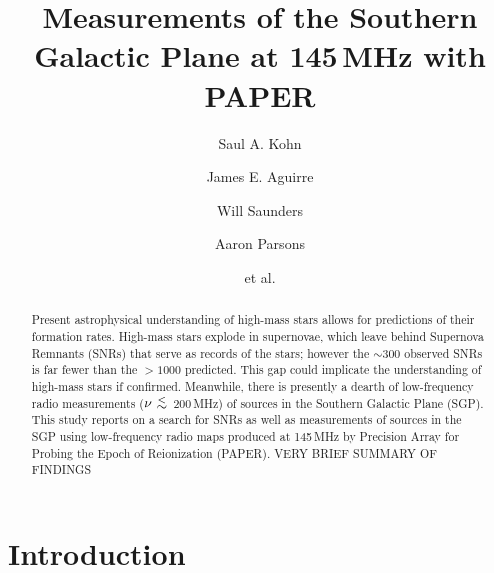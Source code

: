 \documentclass[preprint2,epsf,epsfig,graphics]{emulateapj}
\newcommand {\aplt} {\ {\raise-.5ex\hbox{$\buildrel<\over\sim$}}\ }
\begin{document}
\title{Measurements of the Southern Galactic Plane at 145\,MHz with PAPER}

\author{Saul A. Kohn}
\author{James E. Aguirre}
\author{Will Saunders}
\author{Aaron Parsons}
\author{et al.}



\begin{abstract}
Present astrophysical understanding of high-mass stars allows for predictions of their formation rates.  High-mass stars explode in supernovae, which leave behind Supernova Remnants (SNRs) that serve as records of the stars; however the $\sim$300 observed SNRs is far fewer than the $>1000$ predicted.  This gap could implicate the understanding of high-mass stars if confirmed. 
Meanwhile, there is presently a dearth of low-frequency radio measurements ($\nu\aplt$200\,MHz) of sources in the Southern Galactic Plane (SGP).
This study reports on a search for SNRs as well as measurements of sources in the SGP using low-frequency radio maps produced at 145\,MHz by Precision Array for Probing the Epoch of Reionization (PAPER).
{\color{red} VERY BRIEF SUMMARY OF FINDINGS}
\end{abstract}

\section{Introduction}
\end{document}
